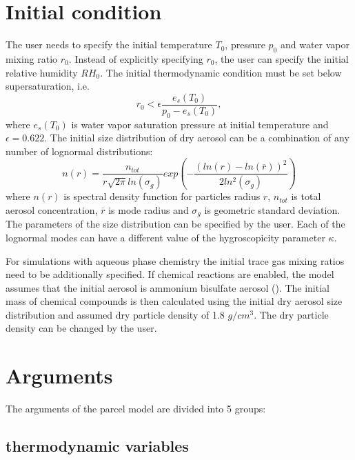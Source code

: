 \documentclass[11pt]{article}
\begin{document}
\section{Initial condition}

The user needs to specify the initial temperature $T_0$, pressure $p_0$ and water vapor mixing ratio $r_0$.
Instead of explicitly specifying $r_0$, the user can specify the initial relative humidity $RH_0$.
The initial thermodynamic condition must be set below supersaturation, i.e.
\begin{equation}
	r_0 < \epsilon \frac{e_s(T_0)}{p_0 - e_s(T_0)},
\end{equation}
\noindent
where 
  $e_s(T_0)$ is water vapor saturation pressure at initial temperature 
  and $\epsilon = 0.622$.
The initial size distribution of dry aerosol can be a combination of any number of lognormal distributions:
\begin{equation}
        n(r) = \frac{n_{tot}}{r\sqrt{2\pi}ln(\sigma_g)}exp\left(-\frac{(ln(r)-ln(\overline{r}))^2}{2ln^2(\sigma_g)}\right)
        \label{lognormalny}
\end{equation}
\noindent
where 
  $n(r)$ is spectral density function for particles radius $r$, 
  $n_{tot}$ is total aerosol concentration, 
  $\overline{r}$ is mode radius and 
  $\sigma_g$ is geometric standard deviation.
The parameters of the size distribution can be specified by the user.
Each of the lognormal modes can have a different value of the hygroscopicity parameter $\kappa$.

For simulations with aqueous phase chemistry the initial trace gas mixing ratios 
  need to be additionally specified.
If chemical reactions are enabled, the model assumes that 
  the initial aerosol is ammonium bisulfate aerosol ().
The initial mass of chemical compounds is then calculated using the initial 
  dry aerosol size distribution and assumed dry particle density of 1.8 $g/cm^3$.
The dry particle density can be changed by the user.

\section{Arguments}

The arguments of the parcel model are divided into 5 groups:

\subsection{thermodynamic variables}
\end{document}
